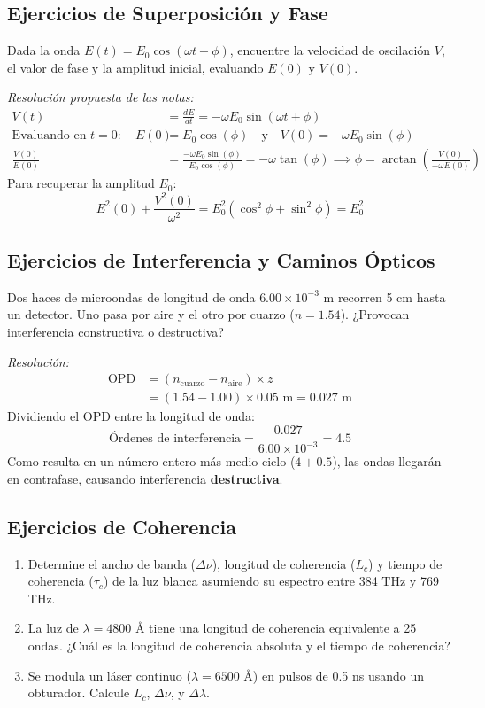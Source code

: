\documentclass[12pt]{article}
\begin{document}
	\subsection{Ejercicios de Superposición y Fase}
	Dada la onda $E(t) = E_0\cos(\omega t + \phi)$, encuentre la velocidad de oscilación $V$, el valor de fase y la amplitud inicial, evaluando $E(0)$ y $V(0)$. 
	
	\textit{Resolución propuesta de las notas:}
	\begin{align*}
		V(t) &= \frac{dE}{dt} = - \omega E_0 \sin(\omega t + \phi) \\
		\text{Evaluando en } t=0: \quad E(0) &= E_0 \cos(\phi) \quad \text{y} \quad V(0) = - \omega E_0 \sin(\phi) \\
		\frac{V(0)}{E(0)} &= \frac{- \omega E_0 \sin(\phi)}{E_0 \cos(\phi)} = - \omega \tan(\phi) \implies \phi = \arctan\left( \frac{V(0)}{-\omega E(0)} \right)
	\end{align*}
	Para recuperar la amplitud $E_0$:
	\begin{equation*}
		E^2(0) + \frac{V^2(0)}{\omega^2} = E_0^2 (\cos^2\phi + \sin^2\phi) = E_0^2
	\end{equation*}
	
	\subsection{Ejercicios de Interferencia y Caminos Ópticos}
	Dos haces de microondas de longitud de onda $6.00 \times 10^{-3}$ m recorren 5 cm hasta un detector. Uno pasa por aire y el otro por cuarzo ($n = 1.54$). ¿Provocan interferencia constructiva o destructiva?
	
	\textit{Resolución:}
	\begin{align*}
		\text{OPD} &= (n_{\text{cuarzo}} - n_{\text{aire}}) \times z \\
		&= (1.54 - 1.00) \times 0.05 \text{ m} = 0.027 \text{ m}
	\end{align*}
	Dividiendo el OPD entre la longitud de onda:
	\begin{equation*}
		\text{Órdenes de interferencia} = \frac{0.027}{6.00 \times 10^{-3}} = 4.5
	\end{equation*}
	Como resulta en un número entero más medio ciclo ($4 + 0.5$), las ondas llegarán en contrafase, causando interferencia \textbf{destructiva}.
	
	\subsection{Ejercicios de Coherencia}
	\begin{enumerate}
		\item Determine el ancho de banda ($\Delta \nu$), longitud de coherencia ($L_c$) y tiempo de coherencia ($\tau_c$) de la luz blanca asumiendo su espectro entre 384 THz y 769 THz.
		\item La luz de $\lambda = 4800 \text{ \AA}$ tiene una longitud de coherencia equivalente a 25 ondas. ¿Cuál es la longitud de coherencia absoluta y el tiempo de coherencia?
		\item Se modula un láser continuo ($\lambda = 6500 \text{ \AA}$) en pulsos de 0.5 ns usando un obturador. Calcule $L_c$, $\Delta \nu$, y $\Delta \lambda$.
	\end{enumerate}
	
\end{document}
